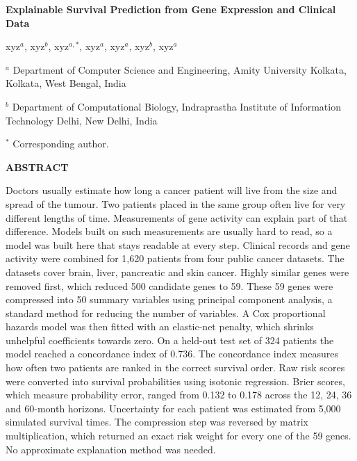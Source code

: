 \documentclass[10pt,a4paper]{article}
\begin{document}
{\LARGE\bfseries
Explainable Survival Prediction from Gene Expression and Clinical Data
\par}

\vspace{1em}

{\large
xyz$^{a}$,
xyz$^{b}$,
xyz$^{a,*}$,
xyz$^{a}$,
xyz$^{a}$,
xyz$^{b}$,
xyz$^{a}$
\par}

\vspace{0.8em}

{\small
$^{a}$ Department of Computer Science and Engineering,
Amity University Kolkata, Kolkata, West Bengal, India

$^{b}$ Department of Computational Biology,
Indraprastha Institute of Information Technology Delhi,
New Delhi, India

$^{*}$ Corresponding author.
}

\vspace{1.2em}

{\bfseries ABSTRACT\par}

Doctors usually estimate how long a cancer patient will live from the size and
spread of the tumour. Two patients placed in the same group often live for very
different lengths of time. Measurements of gene activity can explain part of
that difference. Models built on such measurements are usually hard to read, so
a model was built here that stays readable at every step. Clinical records and
gene activity were combined for 1,620 patients from four public cancer datasets.
The datasets cover brain, liver, pancreatic and skin cancer. Highly similar
genes were removed first, which reduced 500 candidate genes to 59. These 59
genes were compressed into 50 summary variables using principal component
analysis, a standard method for reducing the number of variables. A Cox
proportional hazards model was then fitted with an elastic-net penalty, which
shrinks unhelpful coefficients towards zero. On a held-out test set of 324
patients the model reached a concordance index of 0.736. The concordance index
measures how often two patients are ranked in the correct survival order. Raw
risk scores were converted into survival probabilities using isotonic
regression. Brier scores, which measure probability error, ranged from 0.132 to
0.178 across the 12, 24, 36 and 60-month horizons. Uncertainty for each patient
was estimated from 5,000 simulated survival times. The compression step was
reversed by matrix multiplication, which returned an exact risk weight for every
one of the 59 genes. No approximate explanation method was needed.
\end{document}
